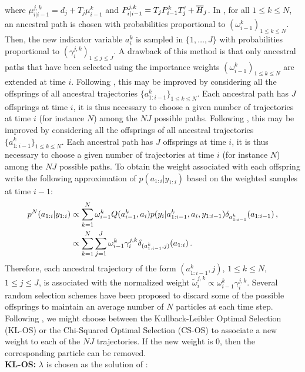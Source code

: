 where  $\mu^{j,k}_{i|i-1} = d_{j} + T_{j}\mu^k_{i-1}$ and $P^{j,k}_{i|i-1} = T_{j}P^k_{i-1}T'_{j} + \overline{H}_{j}$. In \cite{chen:liu:2000}, for all $1\le k \le N$, an ancestral path is chosen with probabilities proportional to  $(\omega^k_{i-1})_{1\le k \le N}$. Then, the new indicator variable $a_i^k$ is sampled in  $\{1,\ldots, J\}$ with probabilities proportional to $(\gamma_i^{j,k})_{1\le j\le J}$. A drawback of this method is that only ancestral paths that have been selected using the importance weights $(\omega^k_{i-1})_{1\le k \le N}$ are extended at time $i$. Following \cite{barembruch:garivier:moulines:2008}, this may be improved by considering all the offsprings of all ancestral trajectories $\{a_{1:i-1}^k\}_{1\le k \le N}$. Each ancestral path has $J$ offsprings at time $i$, it is thus necessary to choose a given number of trajectories at time $i$ (for instance $N$) among the $NJ$ possible paths. Following \cite{fearnhead:clifford:2003,barembruch:garivier:moulines:2008}, this may be improved by considering all the offsprings of all ancestral trajectories $\{a_{1:i-1}^k\}_{1\le k \le N}$. Each ancestral path has $J$ offsprings at time $i$, it is thus necessary to choose a given number of trajectories at time $i$ (for instance $N$) among the $NJ$ possible paths. To obtain the weight associated with each offspring write the following approximation of  $p(a_{1:i}|y_{1:i})$ based on the weighted samples at time $i-1$:
\begin{align*}
p^N(a_{1:i}|y_{1:i})&\propto \sum_{k=1}^N\omega^k_{i-1}Q(a^k_{i-1},a_i)p(y_i|a^k_{1:i-1},a_i,y_{1:i-1})\delta_{a^k_{1:i-1}}(a_{1:i-1})\,,\\
&\propto \sum_{k=1}^N\sum_{j=1}^J\omega^k_{i-1}\gamma_i^{j,k}\delta_{(a^k_{1:i-1},j)}(a_{1:i})\,.
\end{align*}
Therefore, each ancestral trajectory of the form  $(a^k_{1:i-1},j)$, $1\le k \le N$, $1\le j\le J$, is associated with the normalized weight $\tilde{\omega}^{j,k}_{i} \propto \omega^k_{i-1}\gamma_i^{j,k}$. Several random selection schemes have been proposed to discard some of the possible offsprings to maintain an average number of $N$ particles at each time step. Following \cite{barembruch:garivier:moulines:2008}, we might choose between the Kullback-Leibler Optimal Selection (KL-OS) or the Chi-Squared Optimal Selection (CS-OS) to associate a new weight to each of the $NJ$ trajectories. If the new weight is 0, then the corresponding particle can be removed.\\
\textbf{KL-OS:} $\lambda$ is chosen as the solution of :

